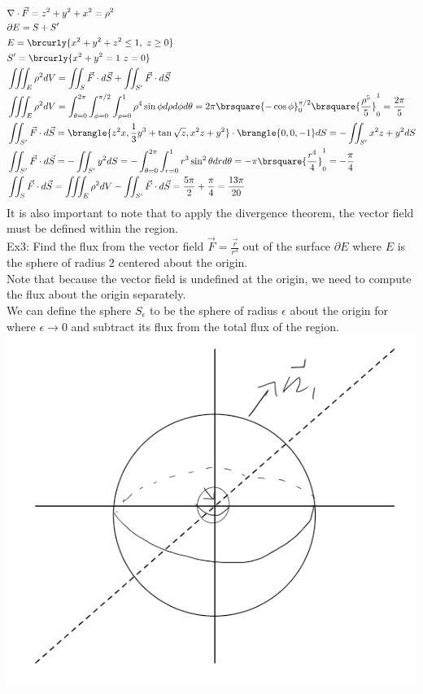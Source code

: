 \begin{align*}
    &\nabla\cdot \vec{F}=z^2+y^2+x^2=\rho^2\\
    &\partial E=S+S'\\
    &E=\brcurly{x^2+y^2+z^2\leq1,\ z\geq0}\\
    &S'=\brcurly{x^2+y^2=1\ z=0}\\
    &\iiint_E \rho^2dV=\iint_S\vec{F}\cdot d\vec{S}+\iint_{S'}\vec{F}\cdot d\vec{S}\\
    &\iiint_E\rho^2dV=\int_{\theta=0}^{2\pi}\int_{\phi=0}^{\pi/2}\int_{\rho=0}^1\rho^4\sin\phi d\rho d\phi d\theta=2\pi\brsquare{-\cos\phi}_0^{\pi/2}\brsquare{\frac{\rho^5}{5}}_0^1=\frac{2\pi}{5}\\
    &\iint_{S'}\vec{F}\cdot d\vec{S}=\brangle{z^2x,\frac{1}{3}y^3+\tan\sqrt{z},x^2z+y^2}\cdot\brangle{0,0,-1}dS=-\iint_{S'}x^2z+y^2 dS\\
    &\iint_{S'}\vec{F}\cdot d\vec{S}=-\iint_{S'}y^2dS=-\int_{\theta=0}^{2\pi}\int_{r=0}^1r^3\sin^2\theta drd\theta=-\pi\brsquare{\frac{r^4}{4}}_0^1=-\frac{\pi}{4}\\
    &\iint_S\vec{F}\cdot d\vec{S}=\iiint_E\rho^2dV-\iint_{S'}\vec{F}\cdot d\vec{S}=\frac{5\pi}{2}+\frac{\pi}{4}=\frac{13\pi}{20}
\end{align*}
It is also important to note that to apply the divergence theorem, the vector field must be defined within the region.\\
Ex3: Find the flux from the vector field $\vec{F}=\frac{\vec{r}}{r^3}$ out of the surface $\partial E$ where $E$ is the sphere of radius 2 centered about the origin.\\
Note that because the vector field is undefined at the origin, we need to compute the flux about the origin separately.\\
We can define the sphere $S_{\epsilon}$ to be the sphere of radius $\epsilon$ about the origin for where $\epsilon\to0$ and subtract its flux from the total flux of the region.\\
\includegraphics[scale=0.5]{Images/Math217Pictures/divergenceThmEx2.png}
